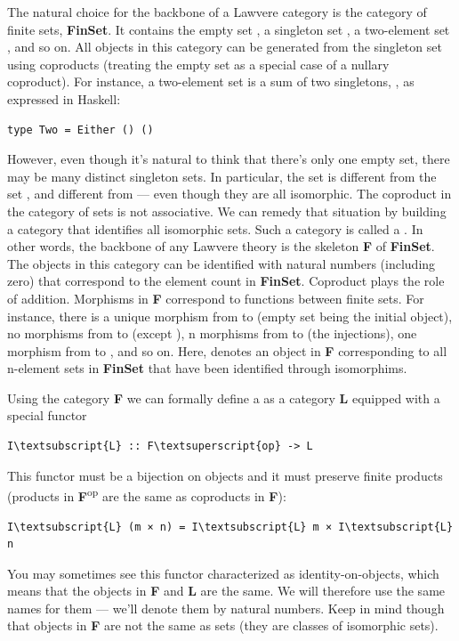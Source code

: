 The natural choice for the backbone of a Lawvere category is the
category of finite sets, \textbf{FinSet}. It contains the empty set
, a singleton set , a two-element set ,
and so on. All objects in this category can be generated from the
singleton set using coproducts (treating the empty set as a special case
of a nullary coproduct). For instance, a two-element set is a sum of two
singletons, , as expressed in Haskell:

\begin{Verbatim}[commandchars=\\\{\}]
type Two = Either () ()
\end{Verbatim}
However, even though it's natural to think that there's only one empty
set, there may be many distinct singleton sets. In particular, the set
 is different from the set , and
different from  --- even though they are all isomorphic. The
coproduct in the category of sets is not associative. We can remedy that
situation by building a category that identifies all isomorphic sets.
Such a category is called a . In other words, the
backbone of any Lawvere theory is the skeleton \textbf{F} of
\textbf{FinSet}. The objects in this category can be identified with
natural numbers (including zero) that correspond to the element count in
\textbf{FinSet}. Coproduct plays the role of addition. Morphisms in
\textbf{F} correspond to functions between finite sets. For instance,
there is a unique morphism from  to  (empty set
being the initial object), no morphisms from  to 
(except ), n morphisms from  to
 (the injections), one morphism from  to ,
and so on. Here,  denotes an object in \textbf{F}
corresponding to all n-element sets in \textbf{FinSet} that have been
identified through isomorphims.

Using the category \textbf{F} we can formally define a  as a category \textbf{L} equipped with a special functor

\begin{Verbatim}[commandchars=\\\{\}]
I\textsubscript{L} :: F\textsuperscript{op} -> L
\end{Verbatim}
This functor must be a bijection on objects and it must preserve finite
products (products in \textbf{F}\textsuperscript{op} are the same as
coproducts in \textbf{F}):

\begin{Verbatim}[commandchars=\\\{\}]
I\textsubscript{L} (m × n) = I\textsubscript{L} m × I\textsubscript{L} n
\end{Verbatim}
You may sometimes see this functor characterized as identity-on-objects,
which means that the objects in \textbf{F} and \textbf{L} are the same.
We will therefore use the same names for them --- we'll denote them by
natural numbers. Keep in mind though that objects in \textbf{F} are not
the same as sets (they are classes of isomorphic sets).

